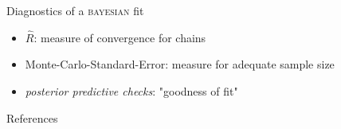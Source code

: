\documentclass[11pt,aspectratio=169,dvipsnames]{beamer}
\begin{document}
	\begin{frame}{Diagnostics of a \textsc{bayesian} fit}
		\begin{itemize}
			\item $\hat{R}$: measure of convergence for chains
			\item Monte-Carlo-Standard-Error: measure for adequate sample size
			\item \emph{posterior predictive checks}: "goodness of fit"\\
			
		\end{itemize}
		\centering
	\end{frame}
	\begin{frame}[allowframebreaks]{References}
		\printbibliography
		
	\end{frame}
	

	
\end{document}

